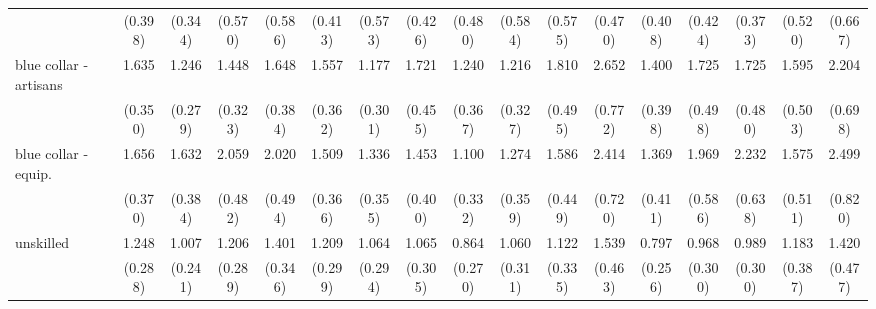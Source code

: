 {\begin{tabular}{l*{16}{c}}
                    &     (0.398)         &     (0.344)         &     (0.570)         &     (0.586)         &     (0.413)         &     (0.573)         &     (0.426)         &     (0.480)         &     (0.584)         &     (0.575)         &     (0.470)         &     (0.408)         &     (0.424)         &     (0.373)         &     (0.520)         &     (0.667)         \\
[1em]
blue collar - artisans&       1.635\sym{*}  &       1.246         &       1.448         &       1.648\sym{*}  &       1.557         &       1.177         &       1.721\sym{*}  &       1.240         &       1.216         &       1.810\sym{*}  &       2.652\sym{***}&       1.400         &       1.725         &       1.725         &       1.595         &       2.204\sym{*}  \\
                    &     (0.350)         &     (0.279)         &     (0.323)         &     (0.384)         &     (0.362)         &     (0.301)         &     (0.455)         &     (0.367)         &     (0.327)         &     (0.495)         &     (0.772)         &     (0.398)         &     (0.498)         &     (0.480)         &     (0.503)         &     (0.698)         \\
[1em]
blue collar - equip.&       1.656\sym{*}  &       1.632\sym{*}  &       2.059\sym{**} &       2.020\sym{**} &       1.509         &       1.336         &       1.453         &       1.100         &       1.274         &       1.586         &       2.414\sym{**} &       1.369         &       1.969\sym{*}  &       2.232\sym{**} &       1.575         &       2.499\sym{**} \\
                    &     (0.370)         &     (0.384)         &     (0.482)         &     (0.494)         &     (0.366)         &     (0.355)         &     (0.400)         &     (0.332)         &     (0.359)         &     (0.449)         &     (0.720)         &     (0.411)         &     (0.586)         &     (0.638)         &     (0.511)         &     (0.820)         \\
[1em]
unskilled           &       1.248         &       1.007         &       1.206         &       1.401         &       1.209         &       1.064         &       1.065         &       0.864         &       1.060         &       1.122         &       1.539         &       0.797         &       0.968         &       0.989         &       1.183         &       1.420         \\
                    &     (0.288)         &     (0.241)         &     (0.289)         &     (0.346)         &     (0.299)         &     (0.294)         &     (0.305)         &     (0.270)         &     (0.311)         &     (0.335)         &     (0.463)         &     (0.256)         &     (0.300)         &     (0.300)         &     (0.387)         &     (0.477)         \\

\end{tabular}}

